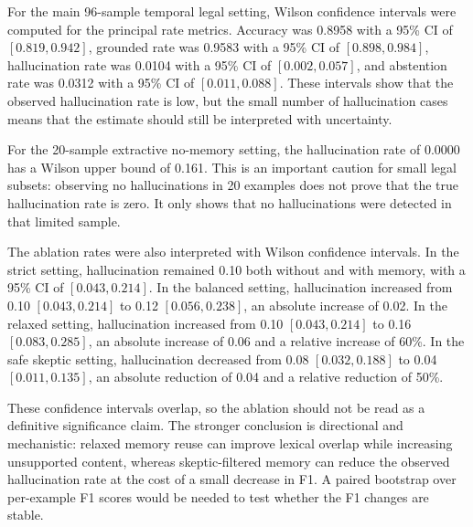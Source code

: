 
For the main 96-sample temporal legal setting, Wilson confidence intervals were
computed for the principal rate metrics. Accuracy was 0.8958 with a 95\% CI of
\([0.819, 0.942]\), grounded rate was 0.9583 with a 95\% CI of \([0.898, 0.984]\),
hallucination rate was 0.0104 with a 95\% CI of \([0.002, 0.057]\), and abstention
rate was 0.0312 with a 95\% CI of \([0.011, 0.088]\). These intervals show that
the observed hallucination rate is low, but the small number of hallucination cases
means that the estimate should still be interpreted with uncertainty.

For the 20-sample extractive no-memory setting, the hallucination rate of 0.0000
has a Wilson upper bound of 0.161. This is an important caution for small legal
subsets: observing no hallucinations in 20 examples does not prove that the true
hallucination rate is zero. It only shows that no hallucinations were detected in
that limited sample.

The ablation rates were also interpreted with Wilson confidence intervals. In the
strict setting, hallucination remained 0.10 both without and with memory, with a
95\% CI of \([0.043, 0.214]\). In the balanced setting, hallucination increased from
0.10 \([0.043, 0.214]\) to 0.12 \([0.056, 0.238]\), an absolute increase of 0.02.
In the relaxed setting, hallucination increased from 0.10 \([0.043, 0.214]\) to
0.16 \([0.083, 0.285]\), an absolute increase of 0.06 and a relative increase of
60\%. In the safe skeptic setting, hallucination decreased from 0.08
\([0.032, 0.188]\) to 0.04 \([0.011, 0.135]\), an absolute reduction of 0.04 and
a relative reduction of 50\%.

These confidence intervals overlap, so the ablation should not be read as a
definitive significance claim. The stronger conclusion is directional and
mechanistic: relaxed memory reuse can improve lexical overlap while increasing
unsupported content, whereas skeptic-filtered memory can reduce the observed
hallucination rate at the cost of a small decrease in F1. A paired bootstrap over
per-example F1 scores would be needed to test whether the F1 changes are stable.

